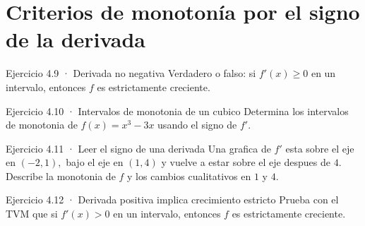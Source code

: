 \documentclass[10pt,a4paper,oneside,openany]{book}
\begin{document}
\section{Criterios de monotonía por el signo de la derivada}
\begin{PSevenExerciseFixed}{Ejercicio 4.9 · Derivada no negativa}
Verdadero o falso: si \(f'(x)\ge 0\) en un intervalo, entonces \(f\) es estrictamente creciente.
\end{PSevenExerciseFixed}
\begin{PSevenExerciseFixed}{Ejercicio 4.10 · Intervalos de monotonia de un cubico}
Determina los intervalos de monotonia de \(f(x)=x^{3}-3x\) usando el signo de \(f'\).
\end{PSevenExerciseFixed}
\begin{PSevenExerciseFixed}{Ejercicio 4.11 · Leer el signo de una derivada}
Una grafica de \(f'\) esta sobre el eje en \((-2,1),\) bajo el eje en \((1,4)\) y vuelve a estar sobre el eje despues de \(4\). Describe la monotonia de \(f\) y los cambios cualitativos en \(1\) y \(4\).
\end{PSevenExerciseFixed}
\begin{PSevenExerciseFixed}{Ejercicio 4.12 · Derivada positiva implica crecimiento estricto}
Prueba con el TVM que si \(f'(x)>0\) en un intervalo, entonces \(f\) es estrictamente creciente.
\end{PSevenExerciseFixed}
\end{document}
